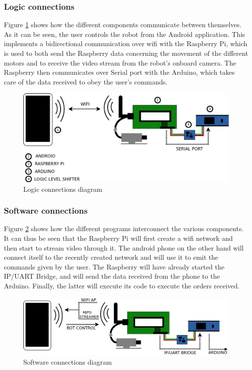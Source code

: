
\subsubsection{Logic connections}

Figure \ref{logicDiagram} shows how the different components communicate between themselves. As it can be seen, the user controls the robot from the Android application. This implements a bidirectional communication over wifi with the Raspberry Pi, which is used to both send the Raspberry data concerning the movement of the different motors and to receive the video stream from the robot's onboard camera. The Raspberry then communicates over Serial port with the Arduino, which takes care of the data received to obey the user's commands.\\

	\begin{figure}[H]
			\centering
			\includegraphics[width=15cm, angle=0]{images/Diagrams/logic.png}
			\caption{Logic connections diagram }
			\label{logicDiagram}
	\end{figure}
	\bigskip


\subsubsection{Software connections}

Figure \ref{swDiagram} shows how the different programs interconnect the various components. It can thus be seen that the Raspberry Pi will first create a wifi network and then start to stream video through it. The android phone on the other hand will connect itself to the recently created network and will use it to emit the commands given by the user. The Raspberry will have already started the IP/UART Bridge, and will send the data received from the phone to the Arduino. Finally, the latter will execute its code to execute the orders received.\\

	\begin{figure}[H]
			\centering
			\includegraphics[width=15cm, angle=0]{images/Diagrams/software.png}
			\caption{Software connections diagram }
			\label{swDiagram}
	\end{figure}
	\bigskip

